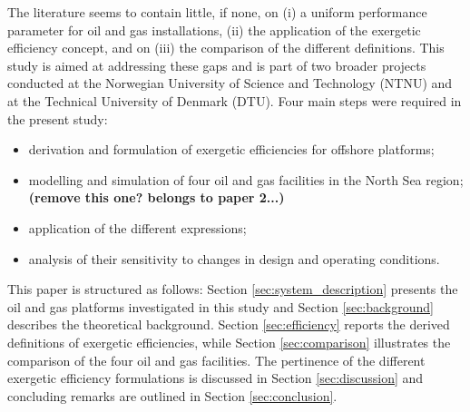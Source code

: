 The literature seems to contain little, if none, on (i) a uniform performance parameter for oil and gas installations, (ii) the application of the exergetic efficiency concept, and on (iii) the comparison of the different definitions. This study is aimed at addressing these gaps and is part of two broader projects conducted at the Norwegian University of Science and Technology (NTNU) and at the Technical University of Denmark (DTU). Four main steps were required in the present study:
\begin{itemize}
	\item derivation and formulation of exergetic efficiencies for offshore platforms;
	\item modelling and simulation of four oil and gas facilities in the North Sea region; \textbf{(remove this one? belongs to paper 2...)}
	\item application of the different expressions;
	\item analysis of their sensitivity to changes in design and operating conditions.
\end{itemize}

This paper is structured as follows: Section \ref{sec:system_description} presents the oil and gas platforms investigated in this study and Section \ref{sec:background} describes the theoretical background. Section \ref{sec:efficiency} reports the derived definitions of exergetic efficiencies, while Section \ref{sec:comparison} illustrates the comparison of the four oil and gas facilities. The pertinence of the different exergetic efficiency formulations is discussed in Section \ref{sec:discussion} and concluding remarks are outlined in Section \ref{sec:conclusion}.
